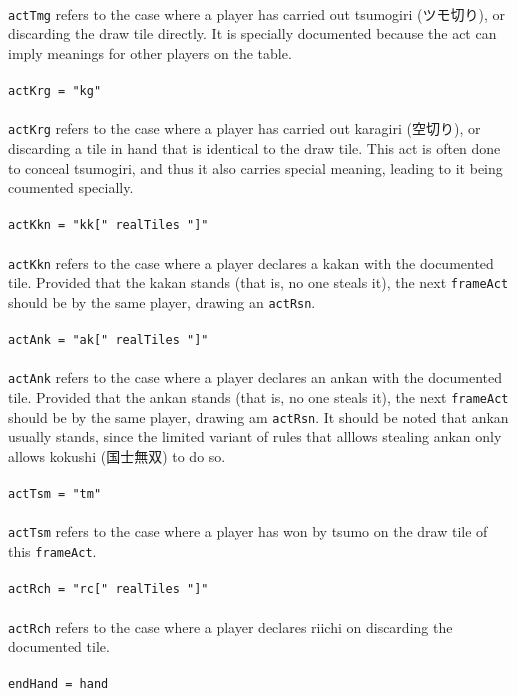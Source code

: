 \documentclass[%
	a4paper%
	,10pt%
	,twoside%
	,notitlepage%
]{article}%
\newcommand*{\ruleSymbol}{\textjapanese{⚠}}%
\newcommand*{\ruleMargin}{\marginpar{\flushright{}\ruleSymbol{}}}%
\newcommand*{\rulePar}{\paragraph*{\ruleMargin{}}}%
\begin{document}
			\paragraph*{}\lstinline/actTmg/ refers to the case where a player has carried out tsumogiri (\textjapanese{ツモ切り}), or discarding the draw tile directly. It is specially documented because the act can imply meanings for other players on the table. %
			\rulePar{}\lstinline/actKrg = "kg"/%
			\paragraph*{}\lstinline/actKrg/ refers to the case where a player has carried out karagiri (\textjapanese{空切り}), or discarding a tile in hand that is identical to the draw tile. This act is often done to conceal tsumogiri, and thus it also carries special meaning, leading to it being coumented specially. %
			\rulePar{}\lstinline/actKkn = "kk[" realTiles "]"/%
			\paragraph*{}\lstinline/actKkn/ refers to the case where a player declares a kakan with the documented tile. Provided that the kakan stands (that is, no one steals it), the next \lstinline/frameAct/ should be by the same player, drawing an \lstinline/actRsn/. %
			\rulePar{}\lstinline/actAnk = "ak[" realTiles "]"/%
			\paragraph*{}\lstinline/actAnk/ refers to the case where a player declares an ankan with the documented tile. Provided that the ankan stands (that is, no one steals it), the next \lstinline/frameAct/ should be by the same player, drawing am \lstinline/actRsn/. It should be noted that ankan usually stands, since the limited variant of rules that alllows stealing ankan only allows kokushi (\textjapanese{国士無双}) to do so. %
			\rulePar{}\lstinline/actTsm = "tm"/%
			\paragraph*{}\lstinline/actTsm/ refers to the case where a player has won by tsumo on the draw tile of this \lstinline/frameAct/. %
			\rulePar{}\lstinline/actRch = "rc[" realTiles "]"/%
			\paragraph*{}\lstinline/actRch/ refers to the case where a player declares riichi on discarding the documented tile. %
			\rulePar{}\lstinline/endHand = hand/%
\end{document}
